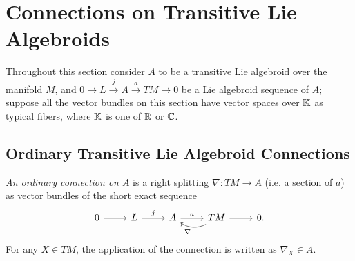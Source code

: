 \section{Connections on Transitive Lie Algebroids}
\label{chConnsectConnectionsA}
Throughout this section consider $A$ to be a transitive Lie algebroid over the manifold $M$, and $0 \to L \xrightarrow{j} A \xrightarrow{a} TM \to 0$ be a Lie algebroid sequence of $A$; suppose all the vector bundles on this section have vector spaces over $\mathbb{K}$ as typical fibers, where $\mathbb{K}$ is one of $\mathbb{R}$ or $\mathbb{C}$.

\subsection{Ordinary Transitive Lie Algebroid Connections}



\begin{definition}
\emph{An ordinary connection on $A$} is a right splitting $\nabla: TM \to A$ (i.e. a section of $a$) as vector bundles of the short exact sequence
\begin{equation}\label{equationDefinitionConnectionRightSplittingNablaSectionAnchorShortExactSequence}
    \begin{tikzcd}
    0 \arrow{r} & L \arrow{r}{j} & A \arrow{r}{a} & TM \arrow{r} \arrow[bend left]{l}{\nabla} & 0.
    \end{tikzcd}
\end{equation}
For any $X \in TM$, the application of the connection is written as $\nabla_X \in A$.
\end{definition}

